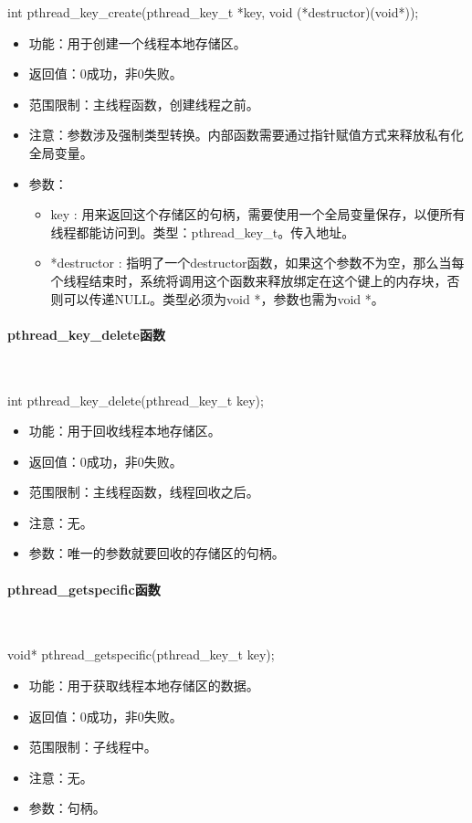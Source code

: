 \documentclass[UTF8]{article}%
\begin{document}
int pthread\_key\_create(pthread\_key\_t *key, void (*destructor)(void*));

\begin{itemize}
    \item 功能：用于创建一个线程本地存储区。
    \item 返回值：0成功，非0失败。
    \item 范围限制：主线程函数，创建线程之前。
    \item 注意：参数涉及强制类型转换。内部函数需要通过指针赋值方式来释放私有化全局变量。
    \item 参数：
    {
        \begin{itemize}
            \item key : 用来返回这个存储区的句柄，需要使用一个全局变量保存，以便所有线程都能访问到。类型：pthread\_key\_t。传入地址。 
            \item  *destructor : 指明了一个destructor函数，如果这个参数不为空，那么当每个线程结束时，系统将调用这个函数来释放绑定在这个键上的内存块，否则可以传递NULL。类型必须为void *，参数也需为void *。
        \end{itemize}
    }
\end{itemize}

\paragraph{pthread\_key\_delete函数}~{}

int pthread\_key\_delete(pthread\_key\_t key);

\begin{itemize}
    \item 功能：用于回收线程本地存储区。
    \item 返回值：0成功，非0失败。
    \item 范围限制：主线程函数，线程回收之后。
    \item 注意：无。
    \item 参数：唯一的参数就要回收的存储区的句柄。
\end{itemize}

\paragraph{pthread\_getspecific函数}~{}

void* pthread\_getspecific(pthread\_key\_t key);  

\begin{itemize}
    \item 功能：用于获取线程本地存储区的数据。
    \item 返回值：0成功，非0失败。
    \item 范围限制：子线程中。
    \item 注意：无。
    \item 参数：句柄。
\end{itemize}
\end{document}
